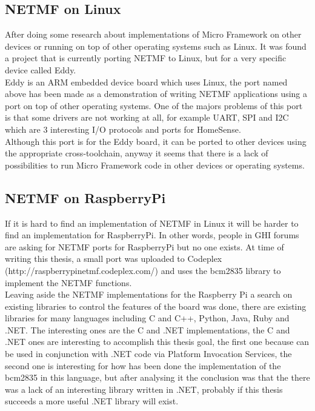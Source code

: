 \subsection{NETMF on Linux}\label{S:SOTA-NETMF-Linux}

After doing some research about implementations of Micro Framework on other devices or running on top of other operating systems such as Linux. It was found a project that is currently porting NETMF to Linux, but for a very specific device called Eddy.
\\
Eddy is an ARM embedded device board which uses Linux, the port named above has been made as a demonstration of writing NETMF applications using a port on top of other operating systems. One of the majors problems of this port is that some drivers are not working at all, for example UART, SPI and I2C which are 3 interesting I/O protocols and ports for HomeSense.
\\
Although this port is for the Eddy board, it can be ported to other devices using the appropriate cross-toolchain, anyway it seems that there is a lack of possibilities to run Micro Framework code in other devices or operating systems.

\subsection{NETMF on RaspberryPi}\label{S:SOTA-NETMF-RPI}

If it is hard to find an implementation of NETMF in Linux it will be harder to find an implementation for RaspberryPi. In other words, people in GHI forums are asking for NETMF ports for RaspberryPi but no one exists. At time of writing this thesis, a small port was uploaded to Codeplex (http://raspberrypinetmf.codeplex.com/) and uses the bcm2835 library to implement the NETMF functions.
\\
Leaving aside the NETMF implementations for the Raspberry Pi a search on existing libraries to control the features of the board was done, there are existing libraries for many languages including C and C++, Python, Java, Ruby and .NET. The interesting ones are the C and .NET implementations, the C and .NET ones are interesting to accomplish this thesis goal, the first one because can be used in conjunction with .NET code via Platform Invocation Services, the second one is interesting for how has been done the implementation of the bcm2835 in this language, but after analysing it the conclusion was that the there was a lack of an interesting library written in .NET, probably if this thesis succeeds a more useful .NET library will exist.